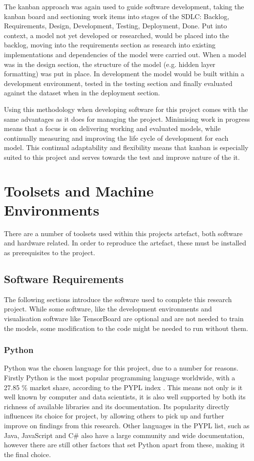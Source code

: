 The kanban approach was again used to guide software development, taking the kanban board and sectioning work items into stages of the SDLC: Backlog, Requirements, Design, Development, Testing, Deployment, Done. Put into context, a model not yet developed or researched, would be placed into the backlog, moving into the requirements section as research into existing implementations and dependencies of the model were carried out. When a model was in the design section, the structure of the model (e.g. hidden layer formatting) was put in place. In development the model would be built within a development environment, tested in the testing section and finally evaluated against the dataset when in the deployment section.

Using this methodology when developing software for this project comes with the same advantages as it does for managing the project. Minimising work in progress means that a focus is on delivering working and evaluated models, while continually measuring and improving the life cycle of development for each model. This continual adaptability and flexibility means that kanban is especially suited to this project and serves towards the test and improve nature of the it.

\section{Toolsets and Machine Environments}
There are a number of toolsets used within this projects artefact, both software and hardware related. In order to reproduce the artefact, these must be installed as prerequisites to the project.

\subsection{Software Requirements}
The following sections introduce the software used to complete this research project. While some software, like the development environments and visualisation software like TensorBoard are optional and are not needed to train the models, some modification to the code might be needed to run without them.


\subsubsection{Python}
Python was the chosen language for this project, due to a number for reasons. Firstly Python is the most popular programming language worldwide, with a 27.85 \% market share, according to the PYPL index \citep{PYPLPopu3:online}. This means not only is it well known by computer and data scientists, it is also well supported by both its richness of available libraries and its documentation. Its popularity directly influences its choice for project, by allowing others to pick up and further improve on findings from this research. Other languages in the PYPL list, such as Java, JavaScript and C\# also have a large community and wide documentation, however there are still other factors that set Python apart from these, making it the final choice. 

